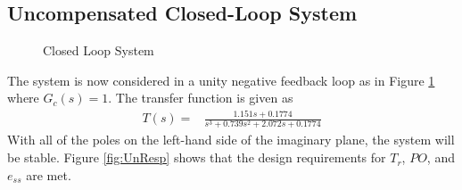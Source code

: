 \documentclass{article}
\begin{document}
    \subsection{Uncompensated Closed-Loop System}
    \begin{figure}[ht]
        \makebox[0pt]{}
        \caption{Closed Loop System}
        \label{fig:BlockDiagram}
    \end{figure}
    The system is now considered in a unity negative feedback loop as in Figure \ref{fig:BlockDiagram} where \(G_c(s)=1\).
    The transfer function is given as
    \begin{equation}
        \begin{aligned}
            T(s)=&\frac{1.151s+0.1774}{s^3+0.739s^2+2.072s+0.1774}
        \end{aligned}
    \end{equation}
    With all of the poles on the left-hand side of the imaginary plane, the system will be stable. 
    Figure \ref{fig:UnResp} shows that the design requirements for $T_r$, $PO$, and $e_{ss}$ are met. 
\end{document}
